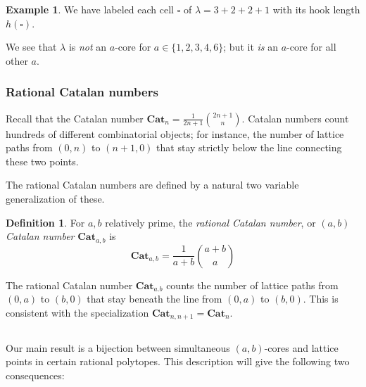 \documentclass{amsart}[12pt]
\theoremstyle{definition}
\newtheorem{example}[dummy]{Example}
\newtheorem{definition}[dummy]{Definition}
\newcommand{\Cat}{\mathbf{Cat}}
\begin{document}
\begin{example}
We have labeled each cell $\square$ of $\lambda=3+2+2+1$ with its hook length $h(\square)$.

\begin{center}
\end{center}
We see that $\lambda$ is \emph{not} an $a$-core for $a\in \{1,2,3,4,6\}$;
but it \emph{is} an $a$-core for all other $a$.
\end{example}

\subsubsection{Rational Catalan numbers}
Recall that the Catalan number $\Cat_n=\frac{1}{2n+1}\binom{2n+1}{n}$.  Catalan numbers count hundreds of different combinatorial objects; for instance, the number of lattice paths from $(0,n)$ to $(n+1,0)$ that stay strictly below the line connecting these two points.

The rational Catalan numbers are defined by a natural two variable generalization of these.
\begin{definition}
For $a,b$ relatively prime, the \emph{rational Catalan number}, or \emph{$(a,b)$ Catalan number} $\Cat_{a,b}$ is 
$$\Cat_{a,b}=\frac{1}{a+b}\binom{a+b}{a}$$ 
\end{definition}

The rational Catalan number $\Cat_{a.b}$ counts the number of lattice paths from $(0,a)$ to $(b,0)$ that stay beneath the line from $(0,a)$ to $(b,0)$.  This is consistent with the specialization $\Cat_{n,n+1}=\Cat_n$.

\subsection{}


Our main result is a bijection between simultaneous $(a,b)$-cores and lattice points in certain rational polytopes.  This description will give the following two consequences: 
\end{document}
